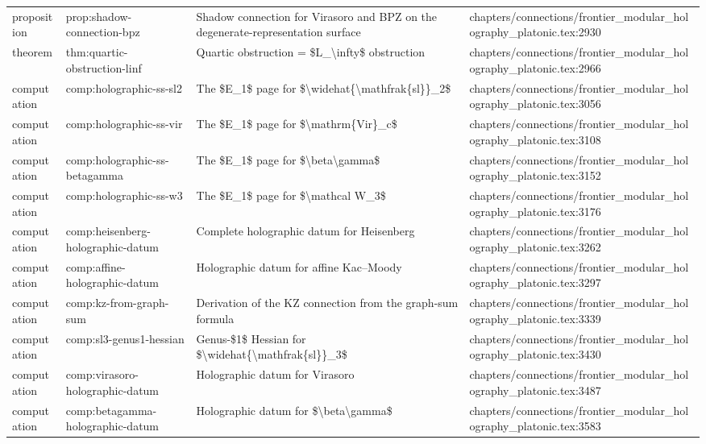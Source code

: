 \documentclass[11pt]{article}
\begin{document}
\begin{longtable}{L{0.10\textwidth}L{0.26\textwidth}L{0.42\textwidth}L{0.22\textwidth}}
proposition & prop:shadow-connection-bpz & Shadow connection for Virasoro and BPZ on the degenerate-representation surface & chapters/connections/frontier\_modular\_holography\_platonic.tex:2930\\
theorem & thm:quartic-obstruction-linf & Quartic obstruction = \$L\_\textbackslash{}infty\$ obstruction & chapters/connections/frontier\_modular\_holography\_platonic.tex:2966\\
computation & comp:holographic-ss-sl2 & The \$E\_1\$ page for \$\textbackslash{}widehat\{\textbackslash{}mathfrak\{sl\}\}\_2\$ & chapters/connections/frontier\_modular\_holography\_platonic.tex:3056\\
computation & comp:holographic-ss-vir & The \$E\_1\$ page for \$\textbackslash{}mathrm\{Vir\}\_c\$ & chapters/connections/frontier\_modular\_holography\_platonic.tex:3108\\
computation & comp:holographic-ss-betagamma & The \$E\_1\$ page for \$\textbackslash{}beta\textbackslash{}gamma\$ & chapters/connections/frontier\_modular\_holography\_platonic.tex:3152\\
computation & comp:holographic-ss-w3 & The \$E\_1\$ page for \$\textbackslash{}mathcal W\_3\$ & chapters/connections/frontier\_modular\_holography\_platonic.tex:3176\\
computation & comp:heisenberg-holographic-datum & Complete holographic datum for Heisenberg & chapters/connections/frontier\_modular\_holography\_platonic.tex:3262\\
computation & comp:affine-holographic-datum & Holographic datum for affine Kac--Moody & chapters/connections/frontier\_modular\_holography\_platonic.tex:3297\\
computation & comp:kz-from-graph-sum & Derivation of the KZ connection from the graph-sum formula & chapters/connections/frontier\_modular\_holography\_platonic.tex:3339\\
computation & comp:sl3-genus1-hessian & Genus-\$1\$ Hessian for \$\textbackslash{}widehat\{\textbackslash{}mathfrak\{sl\}\}\_3\$ & chapters/connections/frontier\_modular\_holography\_platonic.tex:3430\\
computation & comp:virasoro-holographic-datum & Holographic datum for Virasoro & chapters/connections/frontier\_modular\_holography\_platonic.tex:3487\\
computation & comp:betagamma-holographic-datum & Holographic datum for \$\textbackslash{}beta\textbackslash{}gamma\$ & chapters/connections/frontier\_modular\_holography\_platonic.tex:3583\\

\end{longtable}
\end{document}
